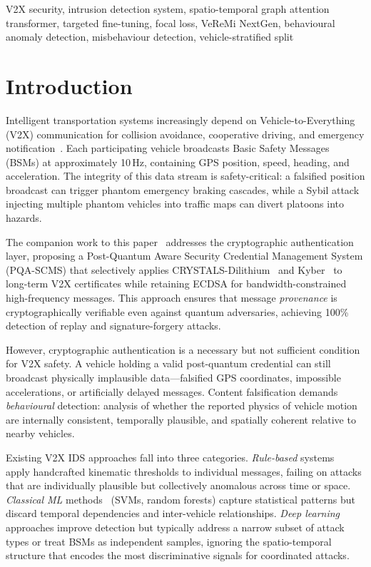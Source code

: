 \documentclass[conference]{IEEEtran}
\begin{document}
\begin{IEEEkeywords}
V2X security, intrusion detection system, spatio-temporal graph attention
transformer, targeted fine-tuning, focal loss, VeReMi NextGen, behavioural
anomaly detection, misbehaviour detection, vehicle-stratified split
\end{IEEEkeywords}

\section{Introduction}
\label{sec:intro}

Intelligent transportation systems increasingly depend on
Vehicle-to-Everything (V2X) communication for collision avoidance,
cooperative driving, and emergency notification~\cite{boualouache2023survey}.
Each participating vehicle broadcasts Basic Safety Messages (BSMs) at
approximately 10\,Hz, containing GPS position, speed, heading, and
acceleration.  The integrity of this data stream is safety-critical: a
falsified position broadcast can trigger phantom emergency braking
cascades, while a Sybil attack injecting multiple phantom vehicles into
traffic maps can divert platoons into hazards.

The companion work to this paper~\cite{pqascms2025} addresses the
cryptographic authentication layer, proposing a Post-Quantum Aware
Security Credential Management System (PQA-SCMS) that selectively applies
CRYSTALS-Dilithium~\cite{dilithium2021} and Kyber~\cite{kyber2021} to
long-term V2X certificates while retaining ECDSA for bandwidth-constrained
high-frequency messages.  This approach ensures that message
\emph{provenance} is cryptographically verifiable even against quantum
adversaries, achieving 100\% detection of replay and signature-forgery
attacks.

However, cryptographic authentication is a necessary but not sufficient
condition for V2X safety.  A vehicle holding a valid post-quantum
credential can still broadcast physically implausible data---falsified GPS
coordinates, impossible accelerations, or artificially delayed messages.
Content falsification demands \emph{behavioural} detection: analysis of
whether the reported physics of vehicle motion are internally consistent,
temporally plausible, and spatially coherent relative to nearby vehicles.

Existing V2X IDS approaches fall into three categories.
\emph{Rule-based} systems~\cite{vanderheijden2018veremi} apply handcrafted
kinematic thresholds to individual messages, failing on attacks that are
individually plausible but collectively anomalous across time or space.
\emph{Classical ML} methods~\cite{gyawali2020challenges} (SVMs, random
forests) capture statistical patterns but discard temporal dependencies and
inter-vehicle relationships.  \emph{Deep learning} approaches improve
detection but typically address a narrow subset of attack types or treat
BSMs as independent samples, ignoring the spatio-temporal structure that
encodes the most discriminative signals for coordinated attacks.
\end{document}
